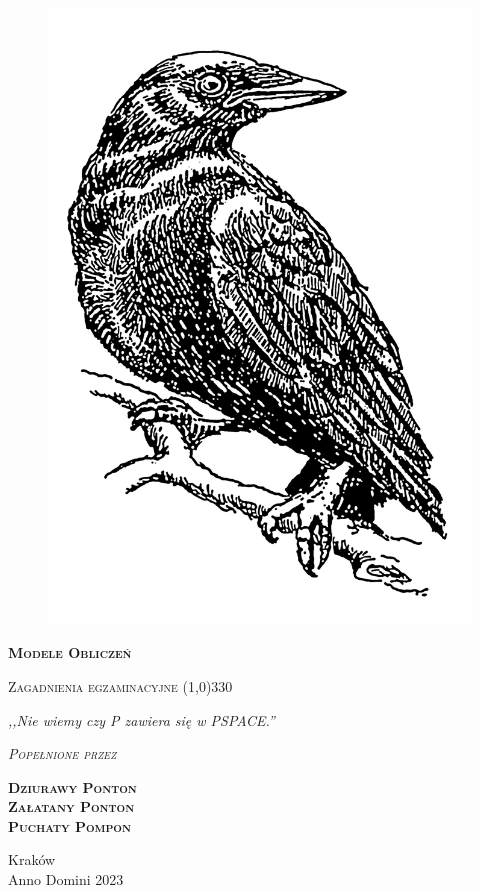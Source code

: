 \begin{titlepage} 
    \begin{center}
        \begin{figure}[h]
            \centering
            \includegraphics{img/crow.png}
        \end{figure}
        
        \Huge
        \textbf{\textsc{Modele Obliczeń}}
        
        \vspace{0.5cm}
        \Large
        \textsc{Zagadnienia egzaminacyjne}
        \line(1,0){330}
        
        \normalsize
        
        \vspace{1cm}
        \textit{,,Nie wiemy czy P zawiera się w PSPACE.''}
        \vspace{1cm}

        \textit{\textsc{Popełnione przez}}\\
        \vspace{5mm}
  
        \textbf{\textsc{Dziurawy Ponton} \\ \textsc{Załatany Ponton} \\ \textsc{Puchaty Pompon} }
 
        \vfill

        Kraków \\
        Anno Domini 2023
    \end{center}
\end{titlepage}